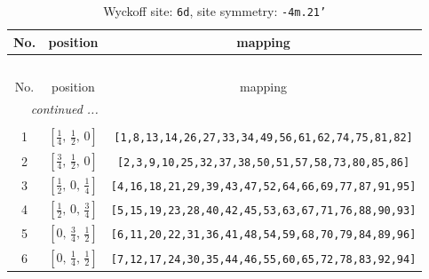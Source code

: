 \documentclass[fleqn,8pt]{jsarticle}
\begin{document}
\begin{longtable}{ccc}
\caption{Wyckoff site: {\tt 6d}, site symmetry: {\tt -4m.21'}}
 \\
 \hline \hline
No. & position & mapping \\ \hline \endfirsthead

\multicolumn{2}{l}{\tablename\ \thetable{}} \\
 \hline \hline
No. & position & mapping \\ \hline \endhead

 \hline \hline
\multicolumn{2}{r}{\footnotesize\it continued ...} \\ \endfoot

 \hline \hline
\multicolumn{2}{r}{} \\ \endlastfoot

1 & $\left[ \frac{1}{4},\, \frac{1}{2},\, 0 \right]$ & {\tt [1,8,13,14,26,27,33,34,49,56,61,62,74,75,81,82]} \\ \hline
2 & $\left[ \frac{3}{4},\, \frac{1}{2},\, 0 \right]$ & {\tt [2,3,9,10,25,32,37,38,50,51,57,58,73,80,85,86]} \\ \hline
3 & $\left[ \frac{1}{2},\, 0,\, \frac{1}{4} \right]$ & {\tt [4,16,18,21,29,39,43,47,52,64,66,69,77,87,91,95]} \\ \hline
4 & $\left[ \frac{1}{2},\, 0,\, \frac{3}{4} \right]$ & {\tt [5,15,19,23,28,40,42,45,53,63,67,71,76,88,90,93]} \\ \hline
5 & $\left[ 0,\, \frac{3}{4},\, \frac{1}{2} \right]$ & {\tt [6,11,20,22,31,36,41,48,54,59,68,70,79,84,89,96]} \\ \hline
6 & $\left[ 0,\, \frac{1}{4},\, \frac{1}{2} \right]$ & {\tt [7,12,17,24,30,35,44,46,55,60,65,72,78,83,92,94]} \\
\end{longtable}
\renewcommand{\arraystretch}{1.2}
\end{document}

